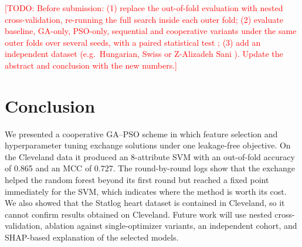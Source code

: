 \documentclass[conference]{IEEEtran}
\newcommand{\todo}[1]{\textcolor{red}{[TODO: #1]}}
\begin{document}
\todo{Before submission: (1) replace the out-of-fold evaluation with nested cross-validation, re-running the full search inside each outer fold; (2) evaluate baseline, GA-only, PSO-only, sequential and cooperative variants under the same outer folds over several seeds, with a paired statistical test \cite{demsar2006stats}; (3) add an independent dataset (e.g.\ Hungarian, Swiss or Z-Alizadeh Sani \cite{alizadehsani2013}). Update the abstract and conclusion with the new numbers.}

\section{Conclusion}
We presented a cooperative GA--PSO scheme in which feature selection and hyperparameter tuning exchange solutions under one leakage-free objective. On the Cleveland data it produced an 8-attribute SVM with an out-of-fold accuracy of 0.865 and an MCC of 0.727. The round-by-round logs show that the exchange helped the random forest beyond its first round but reached a fixed point immediately for the SVM, which indicates where the method is worth its cost. We also showed that the Statlog heart dataset is contained in Cleveland, so it cannot confirm results obtained on Cleveland. Future work will use nested cross-validation, ablation against single-optimizer variants, an independent cohort, and SHAP-based explanation \cite{lundberg2017shap} of the selected models.



\end{document}
